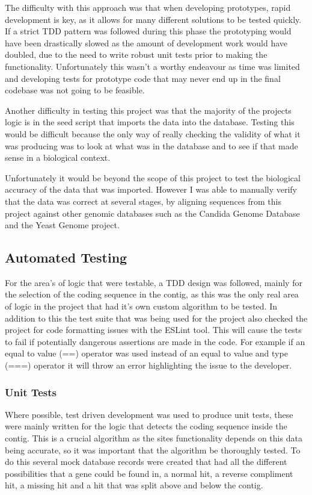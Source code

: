 The difficulty with this approach was that when developing prototypes, rapid development is key, as it allows for many different solutions to be tested quickly. If a strict TDD pattern was followed during this phase the prototyping would have been drastically slowed as the amount of development work would have doubled, due to the need to write robust unit tests prior to making the functionality. Unfortunately this wasn't a worthy endeavour as time was limited and developing tests for prototype code that may never end up in the final codebase was not going to be feasible.

Another difficulty in testing this project was that the majority of the projects logic is in the seed script that imports the data into the database. Testing this would be difficult because the only way of really checking the validity of what it was producing was to look at what was in the database and to see if that made sense in a biological context. 

Unfortunately it would be beyond the scope of this project to test the biological accuracy of the data that was imported. However I was able to manually verify that the data was correct at several stages, by aligning sequences from this project against other genomic databases such as the Candida Genome Database\cite{cgd} and the Yeast Genome\cite{sgd} project. 

\subsection{Automated Testing}
For the area's of logic that were testable, a TDD design was followed, mainly for the selection of the coding sequence in the contig, as this was the only real area of logic in the project that had it's own custom algorithm to be tested. In addition to this the test suite that was being used for the project also checked the project for code formatting issues with the ESLint\cite{eslint} tool. This will cause the tests to fail if potentially dangerous assertions are made in the code. For example if an equal to value (==) operator was used instead of an equal to value and type (===) operator it will throw an error highlighting the issue to the developer. 

\subsubsection{Unit Tests}
Where possible, test driven development was used to produce unit tests, these were mainly written for the logic that detects the coding sequence inside the contig. This is a crucial algorithm as the sites functionality depends on this data being accurate, so it was important that the algorithm be thoroughly tested. To do this several mock database records were created that had all the different possibilities that a gene could be found in, a normal hit, a reverse compliment hit, a missing hit and a hit that was split above and below the contig. 

